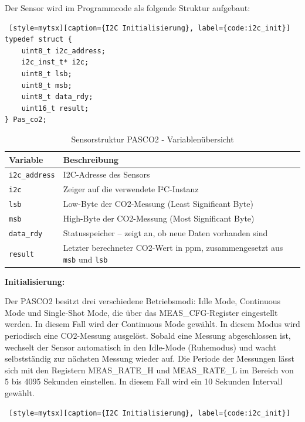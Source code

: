 \begin{inhalt}
Der Sensor wird im Programmcode als folgende Struktur aufgebaut:

\begin{lstlisting} [style=mytsx][caption={I2C Initialisierung}, label={code:i2c_init}]
typedef struct {
    uint8_t i2c_address;
    i2c_inst_t* i2c;
    uint8_t lsb;
    uint8_t msb;
    uint8_t data_rdy;
    uint16_t result;
} Pas_co2;
\end{lstlisting}

\begin{table}[H]
\centering
\renewcommand{\arraystretch}{1.3}
\begin{tabular}{|l|p{11cm}|}
\hline
\rowcolor{cyan!20}
\textbf{Variable} & \textbf{Beschreibung} \\
\hline
\texttt{i2c\_address} & I2C-Adresse des Sensors\\
\hline
\texttt{i2c} & Zeiger auf die verwendete I²C-Instanz \\
\hline
\texttt{lsb} & Low-Byte der CO2-Messung (Least Significant Byte) \\
\hline
\texttt{msb} & High-Byte der CO2-Messung (Most Significant Byte) \\
\hline
\texttt{data\_rdy} & Statusspeicher – zeigt an, ob neue Daten vorhanden sind \\
\hline
\texttt{result} & Letzter berechneter CO2-Wert in ppm, zusammengesetzt aus \texttt{msb} und \texttt{lsb} \\
\hline
\end{tabular}
\caption{Sensorstruktur PASCO2 - Variablenübersicht}
\label{tab:co2_struct_vars}
\end{table}

\textbf{Initialisierung:}

Der PASCO2 besitzt drei verschiedene Betriebsmodi: Idle Mode, Continuous Mode und Single-Shot Mode, die über das MEAS\_CFG-Register eingestellt werden. In diesem Fall wird der Continuous Mode gewählt. In diesem Modus wird periodisch eine CO2-Messung ausgelöst. Sobald eine Messung abgeschlossen ist, wechselt der Sensor automatisch in den Idle-Mode (Ruhemodus) und wacht selbstständig zur nächsten Messung wieder auf. Die Periode der Messungen lässt sich mit den Registern MEAS\_RATE\_H und MEAS\_RATE\_L im Bereich von 5 bis 4095 Sekunden einstellen. In diesem Fall wird ein 10 Sekunden Intervall gewählt.

\begin{lstlisting} [style=mytsx][caption={I2C Initialisierung}, label={code:i2c_init}]


\end{lstlisting}
\end{inhalt}
